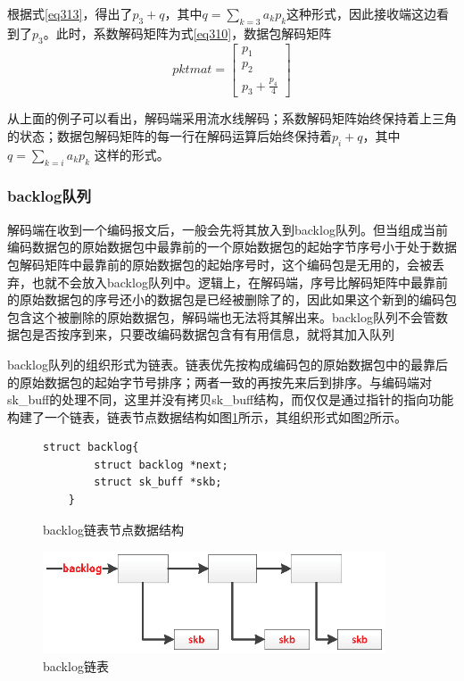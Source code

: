 根据式\ref{eq313}，得出了$p_{3}+q$，其中$q=\sum\limits_{k = 3} {{a_k}{p_k}} $这种形式，因此接收端这边看到了$p_{3}$。此时，系数解码矩阵为式\ref{eq310}，数据包解码矩阵
\begin{equation}
pktmat = \left[ {\begin{array}{*{20}{c}}
	{{p_1}}\\
	{{p_2}}\\
	{{p_3} + \frac{{{p_4}}}{4}}
	\end{array}} \right]
\end{equation}
\par
从上面的例子可以看出，解码端采用流水线解码；系数解码矩阵始终保持着上三角的状态；数据包解码矩阵的每一行在解码运算后始终保持着$p_{i}+q$，其中$q=\sum\limits_{k = i} {{a_k}{p_k}} $ 这样的形式。
\subsubsection{\textbf{backlog队列}}
解码端在收到一个编码报文后，一般会先将其放入到backlog队列。但当组成当前编码数据包的原始数据包中最靠前的一个原始数据包的起始字节序号小于处于数据包解码矩阵中最靠前的原始数据包的起始序号时，这个编码包是无用的，会被丢弃，也就不会放入backlog队列中。逻辑上，在解码端，序号比解码矩阵中最靠前的原始数据包的序号还小的数据包是已经被删除了的，因此如果这个新到的编码包包含这个被删除的原始数据包，解码端也无法将其解出来。backlog队列不会管数据包是否按序到来，只要改编码数据包含有有用信息，就将其加入队列
\par
backlog队列的组织形式为链表。链表优先按构成编码包的原始数据包中的最靠后的原始数据包的起始字节号排序；两者一致的再按先来后到排序。与编码端对sk\_buff的处理不同，这里并没有拷贝sk\_buff结构，而仅仅是通过指针的指向功能构建了一个链表，链表节点数据结构如图\ref{BACKLOG}所示，其组织形式如图\ref{BACKLOG_EPS}所示。
\begin{figure}
	\begin{lstlisting}[language={[ANSI]C}]
	struct backlog{
		struct backlog *next;
		struct sk_buff *skb;
	}
	\end{lstlisting}
	\caption{backlog链表节点数据结构}
	\label{BACKLOG}
\end{figure}
\begin{figure}[htbp]
	\centering
	\includegraphics[width=4in]{figures/backlog.eps}
	\caption{backlog链表}
	\label{BACKLOG_EPS}
\end{figure}

